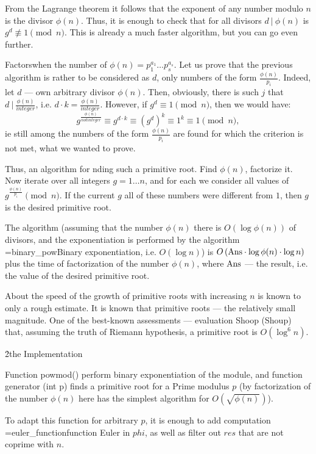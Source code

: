 From the Lagrange theorem it follows that the exponent of any number modulo $n$ is the divisor $\phi(n)$. Thus, it is enough to check that for all divisors $d\ |\ \phi(n)$ is $g^d \not\equiv 1 \pmod{n}$. This is already a much faster algorithm, but you can go even further.

Factorswhen the number of $\phi(n) = p_1^{a_1} \ldots p_s^{a_s}$. Let us prove that the previous algorithm is rather to be considered as $d$, only numbers of the form $\frac{ \phi(n) }{ p_i }$. Indeed, let $d$ --- own arbitrary divisor $\phi(n)$. Then, obviously, there is such $j$ that $d\ |\ \frac{ \phi(n) }{ integer }$, i.e. $d \cdot k = \frac{ \phi(n) }{ integer }$. However, if $g^d \equiv 1 \pmod{n}$, then we would have:
$$ g^{\frac{ \phi(n) }{ not integer }} \equiv g^{d \cdot k} \equiv {\left( g^d \right) }^k \equiv 1^k \equiv 1 \pmod{n}, $$
ie still among the numbers of the form $\frac{ \phi(n) }{ p_i }$ are found for which the criterion is not met, what we wanted to prove.

Thus, an algorithm for nding such a primitive root. Find $\phi(n)$, factorize it. Now iterate over all integers $g = 1 \ldots n$, and for each we consider all values of $g^{ \frac{ \phi(n) }{ p_i } } \pmod{n}$. If the current $g$ all of these numbers were different from $1$, then $g$ is the desired primitive root.

The algorithm (assuming that the number $\phi(n)$ there is $O \left( \log \phi(n) \right)$ of divisors, and the exponentiation is performed by the algorithm \algohref=binary_pow{Binary exponentiation}, i.e. $O(\log n)$) is $O \left( {\rm Ans} \cdot \log \phi(n) \cdot \log n \right)$ plus the time of factorization of the number $\phi(n)$, where $\rm Ans$ --- the result, i.e. the value of the desired primitive root.

About the speed of the growth of primitive roots with increasing $n$ is known to only a rough estimate. It is known that primitive roots --- the relatively small magnitude. One of the best-known assessments --- evaluation Shoop (Shoup) that, assuming the truth of Riemann hypothesis, a primitive root is $O (\log^6 n)$.

\h2{the Implementation}

Function powmod() perform binary exponentiation of the module, and function generator (int p) finds a primitive root for a Prime modulus $p$ (by factorization of the number $\phi(n)$ here has the simplest algorithm for $O( \sqrt{ \phi(n) } )$).

To adapt this function for arbitrary $p$, it is enough to add computation \algohref=euler_function{function Euler} in $phi$, as well as filter out $res$ that are not coprime with $n$.

